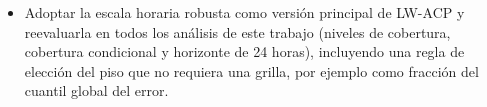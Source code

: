 \begin{itemize}
    \item Adoptar la escala horaria robusta como versión principal de LW-ACP y reevaluarla en todos los análisis de este trabajo (niveles de cobertura, cobertura condicional y horizonte de 24 horas), incluyendo una regla de elección del piso que no requiera una grilla, por ejemplo como fracción del cuantil global del error.
\end{itemize}
